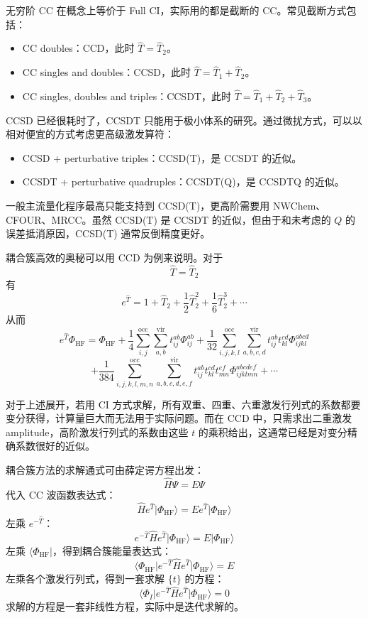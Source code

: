 无穷阶 CC 在概念上等价于 Full CI，实际用的都是截断的 CC。常见截断方式包括：
\begin{itemize}
  \item CC doubles：CCD，此时 $\hat T=\hat T_2$。
  \item CC singles and doubles：CCSD，此时 $\hat T=\hat T_1+\hat T_2$。
  \item CC singles, doubles and triples：CCSDT，此时 $\hat T=\hat T_1+\hat T_2+\hat T_3$。
\end{itemize}

CCSD 已经很耗时了，CCSDT 只能用于极小体系的研究。通过微扰方式，可以以相对便宜的方式考虑更高级激发算符：
\begin{itemize}
  \item CCSD + perturbative triples：CCSD(T)，是 CCSDT 的近似。
  \item CCSDT + perturbative quadruples：CCSDT(Q)，是 CCSDTQ 的近似。
\end{itemize}

一般主流量化程序最高只能支持到 CCSD(T)，更高阶需要用 NWChem、CFOUR、MRCC。虽然 CCSD(T) 是 CCSDT 的近似，但由于和未考虑的 $Q$ 的误差抵消原因，CCSD(T) 通常反倒精度更好。

耦合簇高效的奥秘可以用 CCD 为例来说明。对于
\[
\hat T=\hat T_2
\]
有
\[
e^{\hat T}
=
1+\hat T_2+\frac{1}{2}\hat T_2^2+\frac{1}{6}\hat T_2^3+\cdots
\]
从而
\[
e^{\hat T}\Phi_{\mathrm{HF}}
=
\Phi_{\mathrm{HF}}
+
\frac{1}{4}\sum_{i,j}^{\mathrm{occ}}\sum_{a,b}^{\mathrm{vir}} t_{ij}^{ab}\Phi_{ij}^{ab}
+
\frac{1}{32}\sum_{i,j,k,l}^{\mathrm{occ}}\sum_{a,b,c,d}^{\mathrm{vir}} t_{ij}^{ab}t_{kl}^{cd}\Phi_{ijkl}^{abcd}
\]
\[
+
\frac{1}{384}\sum_{i,j,k,l,m,n}^{\mathrm{occ}}\sum_{a,b,c,d,e,f}^{\mathrm{vir}}
t_{ij}^{ab}t_{kl}^{cd}t_{mn}^{ef}\Phi_{ijklmn}^{abcdef}
+\cdots
\]

对于上述展开，若用 CI 方式求解，所有双重、四重、六重激发行列式的系数都要变分获得，计算量巨大而无法用于实际问题。而在 CCD 中，只需求出二重激发 amplitude，高阶激发行列式的系数由这些 $t$ 的乘积给出，这通常已经是对变分精确系数很好的近似。

耦合簇方法的求解通式可由薛定谔方程出发：
\[
\hat H\Psi=E\Psi
\]
代入 CC 波函数表达式：
\[
\hat H e^{\hat T}\lvert\Phi_{\mathrm{HF}}\rangle
=
E e^{\hat T}\lvert\Phi_{\mathrm{HF}}\rangle
\]
左乘 $e^{-\hat T}$：
\[
e^{-\hat T}\hat H e^{\hat T}\lvert\Phi_{\mathrm{HF}}\rangle
=
E\lvert\Phi_{\mathrm{HF}}\rangle
\]
左乘 $\langle\Phi_{\mathrm{HF}}\rvert$，得到耦合簇能量表达式：
\[
\langle\Phi_{\mathrm{HF}}\rvert e^{-\hat T}\hat H e^{\hat T}\lvert\Phi_{\mathrm{HF}}\rangle
=
E
\]
左乘各个激发行列式，得到一套求解 $\{t\}$ 的方程：
\[
\langle\Phi_I\rvert e^{-\hat T}\hat H e^{\hat T}\lvert\Phi_{\mathrm{HF}}\rangle
=
0
\]
求解的方程是一套非线性方程，实际中是迭代求解的。

